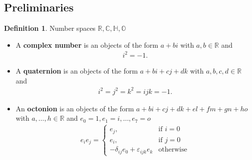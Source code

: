 \documentclass[10pt,a4paper]{article}
\theoremstyle{definition}
\newtheorem{definition}{Definition}[section]
\begin{document}
\subsection{Preliminaries}
\begin{definition}{}
Number spaces $\mathbb{R,C,H,O}$
\begin{itemize}
    \item A {\bf complex number} is an objects of the form $a+bi$ with $a,b\in\mathbb{R}$ and 
    \begin{align}
        i^2=-1.
    \end{align}
    \item A {\bf quaternion} is an objects of the form $a+bi+cj+dk$ with $a,b,c,d\in\mathbb{R}$ and 
    \begin{align}
        i^2=j^2=k^2=ijk=-1.
    \end{align}
    
    \begin{center}
\end{center}
    
    \item An {\bf octonion} is an objects of the form $a+bi+cj+dk+el+fm+gn+ho$ with $a,\dots,h\in\mathbb{R}$ and $e_0=1, e_1=i, \dots, e_7=o$
    \begin{align}
        e_ie_j=\left\{\begin{array}{ll}
                e_j, & \text{if }i=0  \\
                e_i, & \text{if }j=0  \\
                -\delta_{ij}e_0 + \varepsilon_{ijk}e_k & \text{otherwise}
                \end{array}
                \right.
    \end{align}
\end{itemize}
\end{definition}
\end{document}
